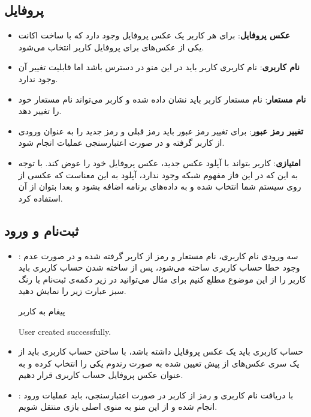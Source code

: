 \documentclass[]{article}
\begin{document}
\subsection*{{\titr پروفایل}}
\begin{itemize}
    \item \textbf{عکس پروفایل}:
     برای هر کاربر یک عکس پروفایل وجود دارد که با ساخت اکانت یکی از عکس‌های  برای پروفایل کاربر انتخاب می‌شود.
    \item \textbf{نام کاربری}:
     نام کاربری کاربر باید در این منو در دسترس باشد اما قابلیت تغییر آن وجود ندارد.
    \item \textbf{نام مستعار}:
     نام مستعار کاربر باید نشان داده شده و کاربر می‌تواند نام مستعار خود را تغییر دهد.
    \item \textbf{تغییر رمز عبور}:
     برای تغییر رمز عبور باید رمز قبلی و رمز جدید را به عنوان ورودی از کاربر گرفته و در صورت اعتبارسنجی عملیات انجام شود.
     
    \item \textbf{امتیازی}: کاربر بتواند با آپلود عکس جدید، عکس پروفایل‌ خود را عوض کند. با توجه به این که در این فاز مفهوم شبکه وجود ندارد، آپلود به این معناست که عکسی از روی سیستم شما انتخاب شده و به داده‌های برنامه اضافه بشود و بعدا بتوان از آن استفاده کرد.
\end{itemize}

\subsection*{{\titr ثبت‌نام و ورود}}
\begin{itemize}
    \item {}:
     سه ورودی نام کاربری، نام مستعار و رمز از کاربر گرفته شده و در صورت عدم وجود خطا حساب کاربری ساخته می‌شود، پس از ساخته شدن حساب کاربری باید کاربر را از این موضوع مطلع کنیم برای مثال می‌توانید در زیر دکمه‌ی ثبت‌نام با رنگ سبز عبارت زیر را نمایش دهید.
     
     
        \begin{mybox}[colback=yellow]{پیغام به کاربر}
     	\begin{latin}	
     		User created successfully.
     	\end{latin}
     \end{mybox}
     
    \item
     حساب کاربری باید یک عکس پروفایل داشته باشد، با ساختن حساب کاربری باید از یک سری عکس‌های از پیش تعیین شده به صورت رندوم یکی را انتخاب کرده و به عنوان عکس پروفایل حساب کاربری قرار دهیم.
    \item {}:
     با دریافت نام کاربری و رمز از کاربر در صورت اعتبارسنجی، باید عملیات ورود انجام شده و از این منو به منوی اصلی بازی منتقل شویم.
\end{itemize}
\end{document}
